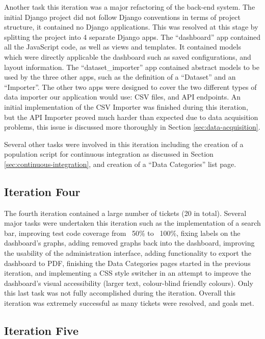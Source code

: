 \documentclass{l3proj}
\begin{document}
Another task this iteration was a major refactoring of the back-end system. The initial Django project did not follow Django conventions in terms of project structure, it contained no Django applications. This was resolved at this stage by splitting the project into 4 separate Django apps. The ``dashboard'' app contained all the JavaScript code, as well as views and templates. It contained models which were directly applicable the dashboard such as saved configurations, and layout information. The ``dataset\_importer'' app contained abstract models to be used by the three other apps, such as the definition of a ``Dataset'' and an ``Importer''. The other two apps were designed to cover the two different types of data importer our application would use: CSV files, and API endpoints. An initial implementation of the CSV Importer was finished during this iteration, but the API Importer proved much harder than expected due to data acquisition problems, this issue is discussed more thoroughly in Section \ref{sec:data-acquisition}.

Several other tasks were involved in this iteration including the creation of a population script for continuous integration as discussed in Section \ref{sec:continuous-integration}, and creation of a ``Data Categories'' list page.

\subsection{Iteration Four}
\label{sec:development:iteration-four}

The fourth iteration contained a large number of tickets (20 in total). Several major tasks were undertaken this iteration such as the implementation of a search bar, improving test code coverage from ~50\% to ~100\%, fixing labels on the dashboard's graphs, adding removed graphs back into the dashboard, improving the usability of the administration interface, adding functionality to export the dashboard to PDF, finishing the Data Categories pages started in the previous iteration, and implementing a CSS style switcher in an attempt to improve the dashboard's visual accessibility (larger text, colour-blind friendly colours). Only this last task was not fully accomplished during the iteration. Overall this iteration was extremely successful as many tickets were resolved, and goals met.

\subsection{Iteration Five}
\label{sec:development:iteration-five}
\end{document}
